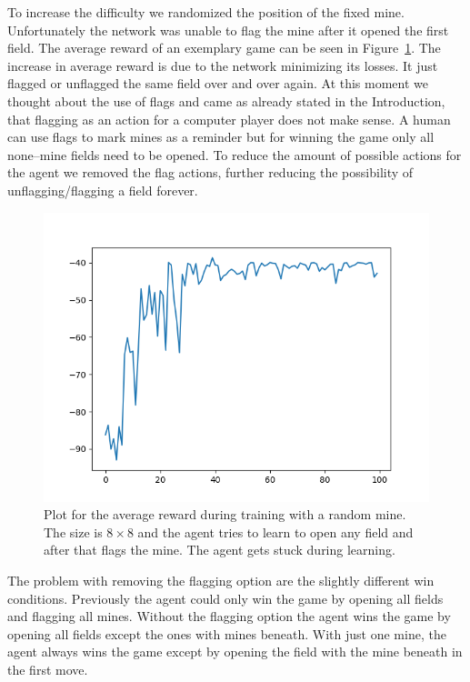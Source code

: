 To increase the difficulty we randomized the position of the fixed mine.
Unfortunately the network was unable to flag the mine after it opened the first field.
The average reward of an exemplary game can be seen in Figure~\ref{fig:random_mine}.
The increase in average reward is due to the network minimizing its losses.
It just flagged or unflagged the same field over and over again.
At this moment we thought about the use of flags and came as already stated in the Introduction, that flagging as an action for a computer player does not make sense.
A human can use flags to mark mines as a reminder but for winning the game only all none--mine fields need to be opened.
To reduce the amount of possible actions for the agent we removed the flag actions, further reducing the possibility of unflagging/flagging a field forever.

\begin{figure}
	\centering
	\includegraphics[width=\textwidth]{images/random_mine_position.png}
	\caption{Plot for the average reward during training with a random mine. The size is $8 \times 8$ and the agent tries to learn to open any field and after that flags the mine. The agent gets stuck during learning.}
	\label{fig:random_mine}
\end{figure}

The problem with removing the flagging option are the slightly different win conditions.
Previously the agent could only win the game by opening all fields and flagging all mines.
Without the flagging option the agent wins the game by opening all fields except the ones with mines beneath.
With just one mine, the agent always wins the game except by opening the field with the mine beneath in the first move.

